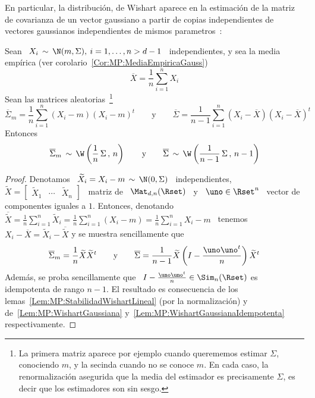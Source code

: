 %
En particular,  la distribuci\'on, de Wishart  aparece en la  estimaci\'on de la
matriz de covarianza de un vector  gaussiano a partir de copias independientes de
vectores gaussianos independientes de mismos parametros~\cite{KotNad04, BilBre99,
  And03, Seb04, GupNag99}:
%
\begin{corolario}\label{Cor:MP:WishartEstimacion}
  Sean  \  $X_i \,  \sim  \,  \N(m,\Sigma), \:  i  =  1, \ldots  ,  n  > d-1$  \
  independientes,      y       sea      la      media       emp\'irica      (ver
  corolario~\ref{Cor:MP:MediaEmpiricaGauss})
  \[
  \overline{X} = \frac{1}{n} \sum_{i=1}^n X_i
  \]
  Sean las  matrices aleatorias~\footnote{La primera matriz  aparece por ejemplo
    cuando querememos estimar  $\Sigma$, conociendo $m$, y la  secinda cuando no
    se conoce $m$. En cada caso, la renormalizaci\'on asegurida que la media del
    estimador es  precisamente $\Sigma$,  es decir que  los estimadores  son sin
    sesgo.}
  \[
  \overline{\Sigma}_m =  \frac{1}{n} \sum_{i=1}^n (X_i  - m) (X_i -  m)^t \qquad
  \mbox{y} \qquad  \overline{\Sigma} =  \frac{1}{n-1} \sum_{i=1}^n \left(  X_i -
    \overline{X} \right) \left( X_i - \overline{X} \right)^t
  \]
  Entonces
  \[
  \overline{\Sigma}_m  \, \sim  \,  \W\left( \frac{1}{n}  \,  \Sigma \,  , \,  n
  \right)  \qquad   \mbox{y}  \qquad  \overline{\Sigma}  \,   \sim  \,  \W\left(
    \frac{1}{n-1} \, \Sigma \, , \, n-1 \right)
  \]
\end{corolario}
%
\begin{proof}
  Denotamos  \  $\widetilde{X}_i   =  X_i  -  m  \,   \sim  \,  \N(0,\Sigma)$  \
  independientes, \ $\widetilde{X} =  \begin{bmatrix} \widetilde{X}_1 & \cdots &
    \widetilde{X}_n \end{bmatrix}$  \ matriz de  \ $\Mat_{d,n}(\Rset)$ \ y  \ $\uno
  \in  \Rset^n$ \  vector de  componentes  iguales a  $1$.  Entonces,  denotando
  $\overline{\widetilde{X}}   =  \frac{1}{n}   \sum_{i=1}^n   \widetilde{X}_i  =
  \frac{1}{n}  \sum_{i=1}^n (X_i  - m)  = \frac{1}{n}  \sum_{i=1}^n X_i  -  m$ \
  tenemos \ $X_i -  \overline{X} = \widetilde{X}_i - \overline{\widetilde{X}}$ y
  se muestra sencillamente que
  \[
  \overline{\Sigma}_m   =  \frac{1}{n}   \widetilde{X}   \widetilde{X}^t  \qquad
  \mbox{y}  \qquad \overline{\Sigma}  = \frac{1}{n-1}  \widetilde{X} \left(  I -
    \frac{\uno \uno^t}{n} \right) \widetilde{X}^t
  \]
  Adem\'as,  se  proba  sencillamente  que   \  $I  -  \frac{\uno  \uno^t}{n}  \in
  \Sim_n(\Rset)$ es idempotenta de rango $n-1$. El resultado es consecuencia de los
  lemas~\ref{Lem:MP:StabilidadWishartLineal}   (por    la   normalizaci\'on)   y
  de~\ref{Lem:MP:WishartGaussiana}       y~\ref{Lem:MP:WishartGaussianaIdempotenta}
  respectivamente.
\end{proof}


